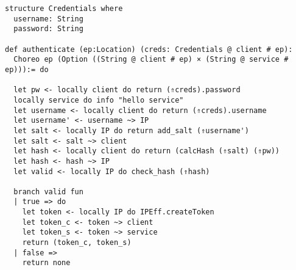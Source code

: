 \begin{lstlisting}[language=lean]
structure Credentials where
  username: String
  password: String

def authenticate (ep:Location) (creds: Credentials @ client # ep):
  Choreo ep (Option ((String @ client # ep) × (String @ service # ep))):= do

  let pw <- locally client do return (⇑creds).password
  locally service do info "hello service"
  let username <- locally client do return (⇑creds).username
  let username' <- username ~> IP
  let salt <- locally IP do return add_salt (⇑username')
  let salt <- salt ~> client
  let hash <- locally client do return (calcHash (⇑salt) (⇑pw))
  let hash <- hash ~> IP
  let valid <- locally IP do check_hash (⇑hash)

  branch valid fun
  | true => do
    let token <- locally IP do IPEff.createToken
    let token_c <- token ~> client
    let token_s <- token ~> service
    return (token_c, token_s)
  | false =>
    return none
\end{lstlisting}
